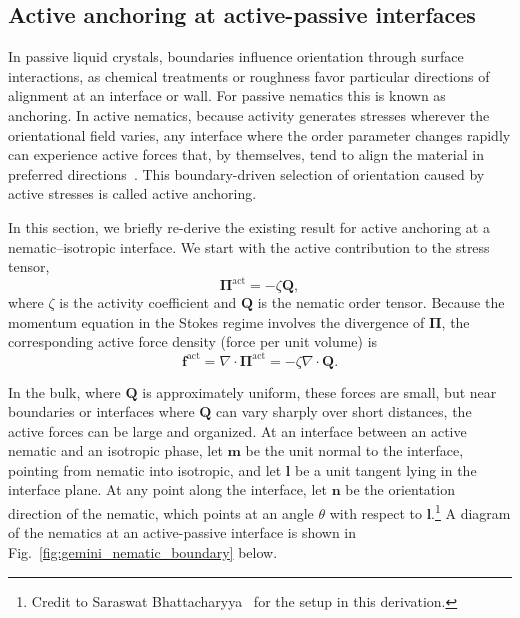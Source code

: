 \documentclass[11pt]{article}
\begin{document}
\subsection{Active anchoring at active-passive interfaces}
\label{sec:active_anchoring_interfaces}

In passive liquid crystals, boundaries influence orientation through surface interactions, as chemical treatments or roughness favor particular directions of alignment at an interface or wall. For passive nematics this is known as anchoring. In active nematics, because activity generates stresses wherever the orientational field varies, any interface where the order parameter changes rapidly can experience active forces that, by themselves, tend to align the material in preferred directions~\cite{blow2014biphasic,Bhattacharyya2024ActiveNematicsMechanobiology}. This boundary-driven selection of orientation caused by active stresses is called active anchoring. 

In this section, we briefly re-derive the existing result for active anchoring at a nematic--isotropic interface. We start with the active contribution to the stress tensor, $$\boldsymbol{\Pi}^{\mathrm{act}} = -\zeta\mathbf{Q},$$
where $\zeta$ is the activity coefficient and $\mathbf{Q}$ is the nematic order tensor. Because the momentum equation in the Stokes regime involves the divergence of $\boldsymbol{\Pi}$, the corresponding active force density (force per unit volume) is
\begin{equation}
\mathbf{f}^{\mathrm{act}} = \nabla\!\cdot\!\boldsymbol{\Pi}^{\mathrm{act}} = -\zeta\nabla\!\cdot\!\mathbf{Q}.
\end{equation}

In the bulk, where $\mathbf{Q}$ is approximately uniform, these forces are small, but near boundaries or interfaces where $\mathbf{Q}$ can vary sharply over short distances, the active forces can be large and organized. At an interface between an active nematic and an isotropic phase, let $\mathbf{m}$ be the unit normal to the interface, pointing from nematic into isotropic, and let $\mathbf{l}$ be a unit tangent lying in the interface plane. At any point along the interface, let $\mathbf{n}$ be the orientation direction of the nematic, which points at an angle $\theta$ with respect to $\mathbf{l}$.\footnote{Credit to Saraswat Bhattacharyya~\cite{Bhattacharyya2024ActiveNematicsMechanobiology} for the setup in this derivation.} A diagram of the nematics at an active-passive interface is shown in Fig.~\ref{fig:gemini_nematic_boundary} below.
\end{document}
